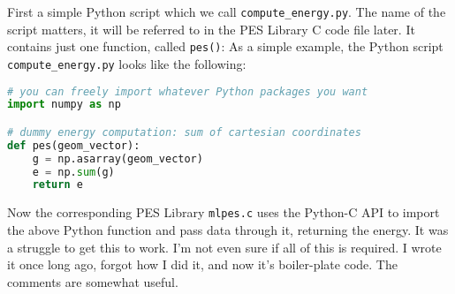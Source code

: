 \documentclass{article}
\begin{document}
First a simple Python script  which we call \texttt{compute\_energy.py}. The name of the script matters, it will be referred to in
the PES Library C code file later. It contains just one function, called \texttt{pes()}:
As a simple example, the Python script \texttt{compute\_energy.py} looks like the following:
\begin{lstlisting}[style=CStyle,language=Python]
# you can freely import whatever Python packages you want
import numpy as np         

# dummy energy computation: sum of cartesian coordinates
def pes(geom_vector):
    g = np.asarray(geom_vector)
    e = np.sum(g)         
    return e
\end{lstlisting}
Now the corresponding PES Library \texttt{mlpes.c} uses the Python-C API to import the above Python function and pass data through it, returning the energy.
It was a struggle to get this to work. I'm not even sure if all of this is required. I wrote it once long ago, forgot how I did it, and now it's boiler-plate code. The comments are somewhat useful.
\newpage
\end{document}
